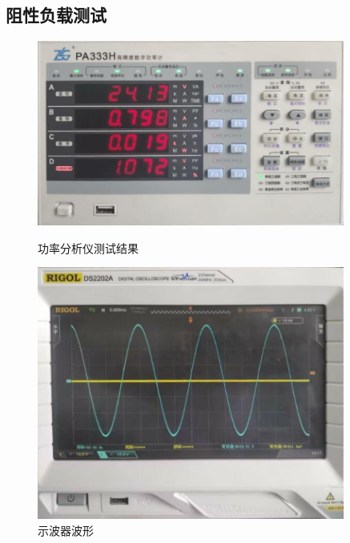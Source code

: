 \documentclass[a4paper,12pt]{article}
\begin{document}
\subsection*{阻性负载测试}
\begin{figure}[htbp]
    \centering
    \begin{minipage}{0.45\textwidth}
        \centering
        \includegraphics[width=0.9\textwidth]{src/result1.jpg}
        \caption{功率分析仪测试结果}
    \end{minipage}
    \qquad
    \begin{minipage}{0.45\textwidth}
        \centering
        \includegraphics[width=0.9\textwidth]{src/result2.jpg}
        \caption{示波器波形}
    \end{minipage}
\end{figure}
\newpage
\end{document}

